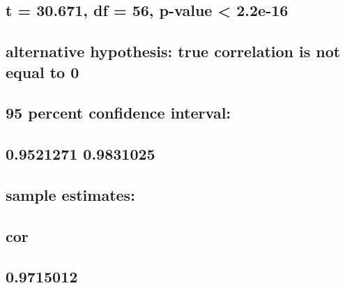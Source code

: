 \documentclass[
  12pt,
]{article}
\begin{document}
\hypertarget{t-30.671-df-56-p-value-2.2e-16}{%
\subsection{t = 30.671, df = 56, p-value \textless{}
2.2e-16}\label{t-30.671-df-56-p-value-2.2e-16}}

\hypertarget{alternative-hypothesis-true-correlation-is-not-equal-to-0-7}{%
\subsection{alternative hypothesis: true correlation is not equal to
0}\label{alternative-hypothesis-true-correlation-is-not-equal-to-0-7}}

\hypertarget{percent-confidence-interval-7}{%
\subsection{95 percent confidence
interval:}\label{percent-confidence-interval-7}}

\hypertarget{section-72}{%
\subsection{0.9521271 0.9831025}\label{section-72}}

\hypertarget{sample-estimates-7}{%
\subsection{sample estimates:}\label{sample-estimates-7}}

\hypertarget{cor-7}{%
\subsection{cor}\label{cor-7}}

\hypertarget{section-73}{%
\subsection{0.9715012}\label{section-73}}

\begin{verbatim}
\end{verbatim}

\hypertarget{section-74}{%
\subsection{}\label{section-74}}
\end{document}
